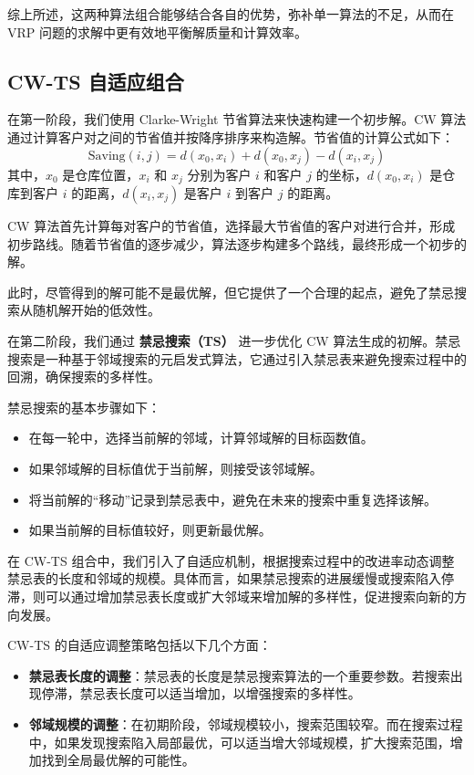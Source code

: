 \documentclass[12pt,a4paper,twoside]{ctexbook}
\begin{document}
综上所述，这两种算法组合能够结合各自的优势，弥补单一算法的不足，从而在 VRP 问题的求解中更有效地平衡解质量和计算效率。

\subsection{CW-TS 自适应组合}

在第一阶段，我们使用 Clarke-Wright 节省算法来快速构建一个初步解。CW 算法通过计算客户对之间的节省值并按降序排序来构造解。节省值的计算公式如下：
\[
\text{Saving}(i,j) = d(x_0, x_i) + d(x_0, x_j) - d(x_i, x_j)
\]
其中，$x_0$ 是仓库位置，$x_i$ 和 $x_j$ 分别为客户 $i$ 和客户 $j$ 的坐标，$d(x_0, x_i)$ 是仓库到客户 $i$ 的距离，$d(x_i, x_j)$ 是客户 $i$ 到客户 $j$ 的距离。

CW 算法首先计算每对客户的节省值，选择最大节省值的客户对进行合并，形成初步路线。随着节省值的逐步减少，算法逐步构建多个路线，最终形成一个初步的解。

此时，尽管得到的解可能不是最优解，但它提供了一个合理的起点，避免了禁忌搜索从随机解开始的低效性。

在第二阶段，我们通过 \textbf{禁忌搜索（TS）} 进一步优化 CW 算法生成的初解。禁忌搜索是一种基于邻域搜索的元启发式算法，它通过引入禁忌表来避免搜索过程中的回溯，确保搜索的多样性。

禁忌搜索的基本步骤如下：
\begin{itemize}
    \item 在每一轮中，选择当前解的邻域，计算邻域解的目标函数值。
    \item 如果邻域解的目标值优于当前解，则接受该邻域解。
    \item 将当前解的“移动”记录到禁忌表中，避免在未来的搜索中重复选择该解。
    \item 如果当前解的目标值较好，则更新最优解。
\end{itemize}

在 CW-TS 组合中，我们引入了自适应机制，根据搜索过程中的改进率动态调整禁忌表的长度和邻域的规模。具体而言，如果禁忌搜索的进展缓慢或搜索陷入停滞，则可以通过增加禁忌表长度或扩大邻域来增加解的多样性，促进搜索向新的方向发展。


CW-TS 的自适应调整策略包括以下几个方面：
\begin{itemize}
    \item \textbf{禁忌表长度的调整}：禁忌表的长度是禁忌搜索算法的一个重要参数。若搜索出现停滞，禁忌表长度可以适当增加，以增强搜索的多样性。
    \item \textbf{邻域规模的调整}：在初期阶段，邻域规模较小，搜索范围较窄。而在搜索过程中，如果发现搜索陷入局部最优，可以适当增大邻域规模，扩大搜索范围，增加找到全局最优解的可能性。
\end{itemize}
\end{document}
